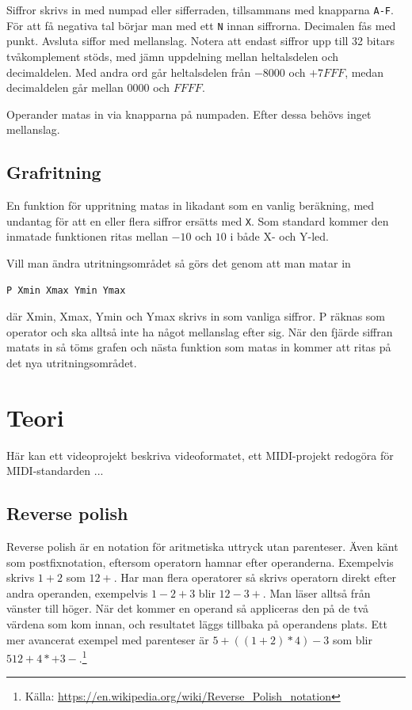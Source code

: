 \documentclass[]{article}
\begin{document}
Siffror skrivs in med numpad eller sifferraden, tillsammans med knapparna \texttt{A-F}. För att få negativa tal börjar man med ett \texttt{N} innan siffrorna. Decimalen fås med punkt. Avsluta siffor med mellanslag. Notera att endast siffror upp till 32 bitars tvåkomplement stöds, med jämn uppdelning mellan heltalsdelen och decimaldelen. Med andra ord går heltalsdelen från $-8000$ och $+7FFF$, medan decimaldelen går mellan $0000$ och $FFFF$.

Operander matas in via knapparna på numpaden. Efter dessa behövs inget mellanslag.

\subsection{Grafritning}
En funktion för uppritning matas in likadant som en vanlig beräkning, med undantag för att en eller flera siffror ersätts med \texttt{X}. Som standard kommer den inmatade funktionen ritas mellan $-10$ och $10$ i både X- och Y-led.

Vill man ändra utritningsområdet så görs det genom att man matar in 
\begin{Verbatim}[frame=single]
P Xmin Xmax Ymin Ymax
\end{Verbatim}
där Xmin, Xmax, Ymin och Ymax skrivs in som vanliga siffror. P räknas som operator och ska alltså inte ha något mellanslag efter sig. När den fjärde siffran matats in så töms grafen och nästa funktion som matas in kommer att ritas på det nya utritningsområdet.

\section{Teori}
Här kan ett videoprojekt beskriva videoformatet, ett MIDI-projekt redogöra för MIDI-standarden ...
\subsection{Reverse polish}
Reverse polish är en notation för aritmetiska uttryck utan parenteser. Även känt som postfixnotation, eftersom operatorn hamnar efter operanderna. Exempelvis skrivs $1+2$ som $1 2 +$. Har man flera operatorer så skrivs operatorn direkt efter andra operanden, exempelvis $1-2+3$ blir $1 2 - 3 +$. Man läser alltså från vänster till höger. När det kommer en operand så appliceras den på de två värdena som kom innan, och resultatet läggs tillbaka på operandens plats. Ett mer avancerat exempel med parenteser är $5 + ((1 + 2) * 4) - 3$ som blir $5 1 2 + 4 * + 3 -$.\footnote{Källa: \href{https://en.wikipedia.org/wiki/Reverse_Polish_notation}{\url{https://en.wikipedia.org/wiki/Reverse_Polish_notation}}}
\end{document}
